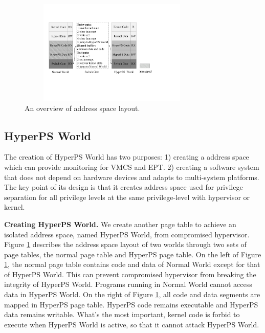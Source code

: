 \documentclass[conference]{IEEEtran}
\begin{document}



\begin{figure}
\centerline{\includegraphics[width=9cm, height=5cm]{pdfvmcs2.pdf}}%
\caption{An overview of address space layout.} \label{fig2}
\end{figure}


\subsection{HyperPS World} \label {HWorld}

The creation of HyperPS World has two purposes: 1) creating a address space which can provide monitoring for VMCS and EPT. 2) creating a software system that does not depend on hardware devices and adapts to multi-system platforms. The key point of its design is that it creates address space used for privilege separation for all privilege levels at the same privilege-level with hypervisor or kernel. 

\textbf{Creating HyperPS World.}
We create another page table to achieve an isolated address space, named HyperPS World, from compromised hypervisor.
Figure \ref{fig2} describes the address space layout of two worlds through two sets of page tables, the normal page table and HyperPS page table. On the left of Figure \ref{fig2}, the normal page table contains code and data of Normal World except for that of HyperPS World. This can prevent compromised hypervisor from breaking the integrity of HyperPS World. Programs running in Normal World cannot access data in HyperPS World. On the right of Figure \ref{fig2}, all code and data segments are mapped in HyperPS page table.
HyperPS code remains executable and HyperPS data remains writable. What's the most important, kernel code is forbid to execute when HyperPS World is active, so that it cannot attack HyperPS World.
\end{document}
